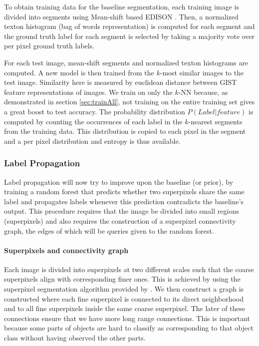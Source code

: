 \documentclass{article} %
\begin{document}
To obtain training data for the baseline segmentation, each training image is divided into segments using Mean-shift based EDISON \cite{meanshift}.
Then, a normalized texton histogram (bag of words representation) is computed for each segment and the ground truth label for each segment is selected by taking a majority vote over per pixel ground truth labels.

For each test image, mean-shift segments and normalized texton histograms are computed.
A new model is then trained from the $k$-most similar images to the test image. Similarity here is measured by euclidean distance between GIST \cite{Gist} feature representations of images.  We train on only the $k$-NN because, as demonstrated in section \ref{sec:trainAll}, not training on the entire training set gives a great boost to test accuracy.
The probability distribution $P(Label | feature)$ is computed by counting the occurrences of each label in the $k$-nearest segments from the training data.
This distribution is copied to each pixel in the segment and a per pixel distribution and entropy is thus available.

\subsubsection{Label Propagation}
Label propagation will now try to improve upon the baseline (or prior), by training a random forest that predicts whether two superpixels share the same label and propagates labels whenever this prediction contradicts the baseline's output.
This procedure requires that the image be divided into small regions (superpixels) and also requires the construction of a superpixel connectivity graph, the edges of which will be queries given to the random forest.

\paragraph{Superpixels and connectivity graph}
\label{sec:labprop}
Each image is divided into superpixels at two different scales such that
the coarse superpixels align with corresponding finer ones.
This is achieved by using the superpixel segmentation algorithm provided by \cite{supix}.
We then construct a graph is constructed where each fine superpixel is connected to its
direct neighborhood and to all fine superpixels inside the same
coarse superpixel.
The later of these connections ensure that we have more long range connections. This is important because some parts of objects are hard to classify as corresponding to that object class without having observed the other parts.
\end{document}
